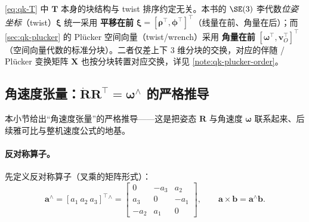 \begin{note}[se(3) 平移在前的换算]\label{note:qk-twist-order}
\cref{eq:qk-T} 中 $\mathbf{T}$ 本身的块结构与 twist 排序约定无关。本书的 $\SE(3)$ 李代数\emph{位姿坐标}（twist）$\boldsymbol{\xi}$ 统一采用 \textbf{平移在前} $\boldsymbol{\xi}=[\boldsymbol{\rho}^\top,\boldsymbol{\phi}^\top]^\top$（线量在前、角量在后）；而 \cref{sec:qk-plucker} 的 Plücker 空间向量（twist/wrench）采用 \textbf{角量在前} $[\boldsymbol{\omega}^\top,\boldsymbol{v}_O^\top]^\top$（空间向量代数的标准分块）。二者仅差上下 $3$ 维分块的交换，对应的伴随 / Plücker 变换矩阵 $\mathbf{X}$ 也按分块转置对应交换，详见 \cref{note:qk-plucker-order}。
\end{note}

\subsection{角速度张量：\texorpdfstring{$\dot{\mathbf{R}}\mathbf{R}^\top=\boldsymbol{\omega}^\wedge$}{Rdot R^T = omega^} 的严格推导}
\label{subsec:qk-angular-vel}

本小节给出“角速度张量”的严格推导\cite{yu2021quadruped}——这是把姿态 $\mathbf{R}$ 与角速度 $\boldsymbol{\omega}$ 联系起来、后续雅可比与整机速度公式的地基。

\paragraph{反对称算子。}
先定义反对称算子（叉乘的矩阵形式）\cite{yu2021quadruped,unitree2023quadruped}：
\begin{equation}
  \boldsymbol{a}^{\wedge}=[a_1\ a_2\ a_3]^\top{}^{\wedge}
  =\begin{bmatrix}0&-a_3&a_2\\a_3&0&-a_1\\-a_2&a_1&0\end{bmatrix},
  \qquad \boldsymbol{a}\times\boldsymbol{b}=\boldsymbol{a}^{\wedge}\boldsymbol{b}.
  \label{eq:qk-skew}
\end{equation}

